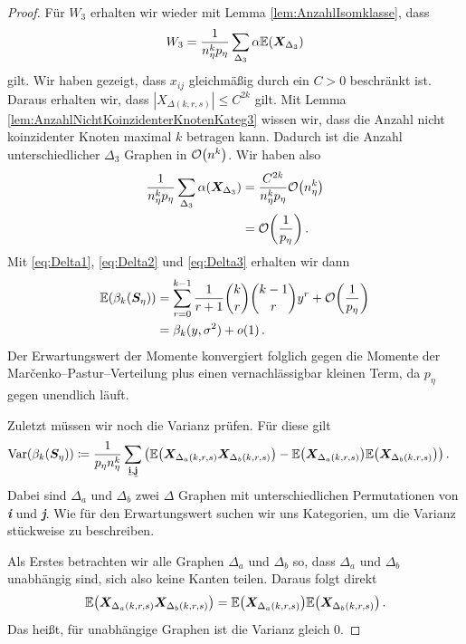 \documentclass[../Bachelor_LennartKoliwer.tex]{subfiles}
\begin{document}
\begin{proof}
    Für $W_3$ erhalten wir wieder mit Lemma \ref{lem:AnzahlIsomklasse}, dass
    \begin{align*}
        W_3 = \frac{1}{n_\eta^k p_\eta}\sum_{\Delta_3} \alpha\EE\lr{\bm{X}_{\Delta_3}}
    \end{align*}
    gilt.
    Wir haben gezeigt, dass $x_{ij}$ gleichmäßig durch ein $C>0$ beschränkt ist. 
    Daraus erhalten wir, dass $|X_{\Delta(k,r,s)}|\leq C^{2k}$ gilt. 
    Mit Lemma \ref{lem:AnzahlNichtKoinzidenterKnotenKateg3} wissen wir, dass die Anzahl nicht koinzidenter Knoten maximal $k$ betragen kann. 
    Dadurch ist die Anzahl unterschiedlicher $\Delta_3$ Graphen in $\mathcal{O}\lr{n^k}$. Wir haben also
    \begin{align}
        \frac{1}{n_\eta^k p_\eta}\sum_{\Delta_3} \alpha\lr{\bm{X}_{\Delta_3}} &= \frac{C^{2k}}{n_\eta^k p_\eta} \mathcal{O}\lr{n_\eta^k} \nonumber\\
        &= \mathcal{O}\lr{\frac{1}{p_\eta}}\,. \label{eq:Delta3}
    \end{align}
    Mit \eqref{eq:Delta1}, \eqref{eq:Delta2} und \eqref{eq:Delta3} erhalten wir dann
    \begin{align}
        \EE(\beta_k(\bm{S}_\eta)) &= \sum_{r=0}^{k-1}\frac{1}{r+1}\binom{k}{r}\binom{k-1}{r}y^r+\mathcal{O}\lr{\frac{1}{p_\eta}} \nonumber\\
                        &=\beta_k(y,\sigma^2)+o(1)\,. \label{eq:Erw}
    \end{align}
    Der Erwartungswert der Momente konvergiert folglich gegen die Momente der Mar\v{c}enko--Pastur--Verteilung plus einen vernachlässigbar kleinen Term, da $p_\eta$ gegen unendlich läuft.

    Zuletzt müssen wir noch die Varianz prüfen.
    Für diese gilt
    \begin{align*}
        \text{Var}(\beta_k(\bm{S}_\eta)) &\coloneqq \frac{1}{p_\eta n_\eta^k} \sum_{\emph{\textbf{i}},\emph{\textbf{j}}} \lr{\EE\lr{\bm{X}_{\Delta_a(k,r,s)}\bm{X}_{\Delta_b(k,r,s)}}-\EE\lr{\bm{X}_{\Delta_a(k,r,s)}}\EE\lr{\bm{X}_{\Delta_b(k,r,s)}}}\,.
    \end{align*}
    Dabei sind $\Delta_a$ und $\Delta_b$ zwei $\Delta$ Graphen mit unterschiedlichen Permutationen von \emph{\textbf{i}} und \emph{\textbf{j}}. 
    Wie für den Erwartungswert suchen wir uns Kategorien, um die Varianz stückweise zu beschreiben.

    Als Erstes betrachten wir alle Graphen $\Delta_a$ und $\Delta_b$ so, dass $\Delta_a$ und $\Delta_b$ unabhängig sind, sich also keine Kanten teilen.
    Daraus folgt direkt
    \begin{align*}
        \EE\lr{\bm{X}_{\Delta_a(k,r,s)}\bm{X}_{\Delta_b(k,r,s)}} = \EE\lr{\bm{X}_{\Delta_a(k,r,s)}}\EE\lr{\bm{X}_{\Delta_b(k,r,s)}}\,.
    \end{align*} 
    Das heißt, für unabhängige Graphen ist die Varianz gleich $0$.


\end{proof}
\end{document}
